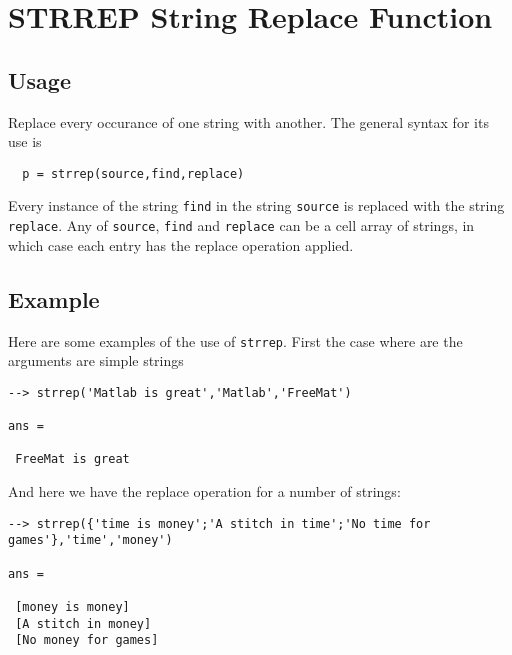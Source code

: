 \section{STRREP String Replace Function}

\subsection{Usage}

Replace every occurance of one string with another.  The
general syntax for its use is
\begin{verbatim}
  p = strrep(source,find,replace)
\end{verbatim}
Every instance of the string \verb|find| in the string \verb|source| is
replaced with the string \verb|replace|.  Any of \verb|source|, \verb|find|
and \verb|replace| can be a cell array of strings, in which case
each entry has the replace operation applied.
\subsection{Example}

Here are some examples of the use of \verb|strrep|.  First the case
where are the arguments are simple strings
\begin{verbatim}
--> strrep('Matlab is great','Matlab','FreeMat')

ans = 

 FreeMat is great
\end{verbatim}
And here we have the replace operation for a number of strings:
\begin{verbatim}
--> strrep({'time is money';'A stitch in time';'No time for games'},'time','money')

ans = 

 [money is money] 
 [A stitch in money] 
 [No money for games] 
\end{verbatim}
